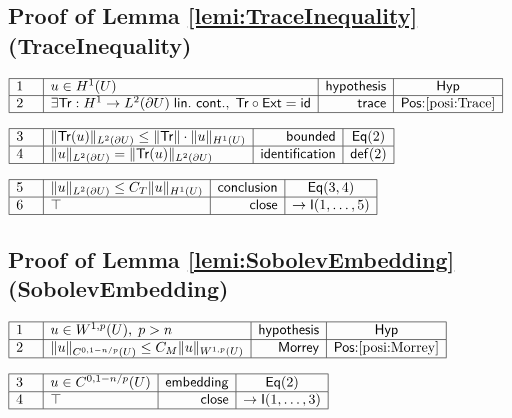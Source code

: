 \documentclass[11pt,reqno]{amsart}
\begin{document}
	\subsection*{Proof of Lemma \protect\ref{lemi:TraceInequality} (\textsf{TraceInequality})}
	\noindent$\begin{array}{|m{0.5cm}|l|r|c|}
	\hline
	1 & u\in H^{1}(U) & \mathsf{hypothesis} & \mathsf{Hyp} \\ \hline
	2 & \exists\mathsf{Tr}:H^{1}\to L^{2}(\partial U)\;\mathsf{lin.\ cont.},\;\mathsf{Tr}\circ\mathsf{Ext}=\mathsf{id} & \mathsf{trace} & \textsf{Pos:}\ref{posi:Trace} \\ \hline
	\end{array}$
	\par\nointerlineskip\noindent$\begin{array}{|m{0.5cm}|l|r|c|}
	\hline
	3 & \|\mathsf{Tr}(u)\|_{L^{2}(\partial U)}\le\|\mathsf{Tr}\|\cdot\|u\|_{H^{1}(U)} & \mathsf{bounded} & \mathsf{Eq}(2) \\ \hline
	4 & \|u\|_{L^{2}(\partial U)}=\|\mathsf{Tr}(u)\|_{L^{2}(\partial U)} & \mathsf{identification} & \mathsf{def}(2) \\ \hline
	\end{array}$
	\par\nointerlineskip\noindent$\begin{array}{|m{0.5cm}|l|r|c|}
	\hline
	5 & \|u\|_{L^{2}(\partial U)}\le C_{T}\|u\|_{H^{1}(U)} & \mathsf{conclusion} & \mathsf{Eq}(3,4) \\ \hline
	6 & \top & \mathsf{close} & \to\mathsf{I}(1,\dots,5) \\ \hline
	\end{array}$
	\medskip
	
	\subsection*{Proof of Lemma \protect\ref{lemi:SobolevEmbedding} (\textsf{SobolevEmbedding})}
	\noindent$\begin{array}{|m{0.5cm}|l|r|c|}
	\hline
	1 & u\in W^{1,p}(U),\;p>n & \mathsf{hypothesis} & \mathsf{Hyp} \\ \hline
	2 & \|u\|_{C^{0,1-n/p}(U)}\le C_{M}\|u\|_{W^{1,p}(U)} & \mathsf{Morrey} & \textsf{Pos:}\ref{posi:Morrey} \\ \hline
	\end{array}$
	\par\nointerlineskip\noindent$\begin{array}{|m{0.5cm}|l|r|c|}
	\hline
	3 & u\in C^{0,1-n/p}(U) & \mathsf{embedding} & \mathsf{Eq}(2) \\ \hline
	4 & \top & \mathsf{close} & \to\mathsf{I}(1,\dots,3) \\ \hline
	\end{array}$
	\medskip
	
\end{document}
